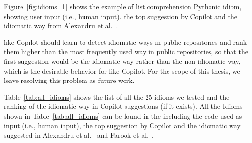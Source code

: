 Figure~\ref{fig:idioms_1} shows the example of list comprehension Pythonic idiom, showing user input (i.e., human input), the top suggestion by Copilot and the idiomatic way from Alexandru et al.~\cite{Alexandru2018}.

\cct{} like Copilot should learn to detect idiomatic ways in public repositories and rank them higher than the most frequently used way in public repositories, so that the first suggestion would be the idiomatic way rather than the non-idiomatic way, which is the desirable behavior for \cct{} like Copilot. For the scope of this thesis, we leave resolving this problem as future work.


Table~\ref{tab:all_idioms} shows the list of all the 25 idioms we tested and the ranking of the idiomatic way in Copilot suggestions (if it exists).
All the Idioms shown in Table~\ref{tab:all_idioms} can be found in the \repl{} including the code used as input (i.e., human input), the top suggestion by Copilot and the idiomatic way suggested in Alexandru et al.~\cite{Alexandru2018} and Farook et al.~\cite{idioms}. 

